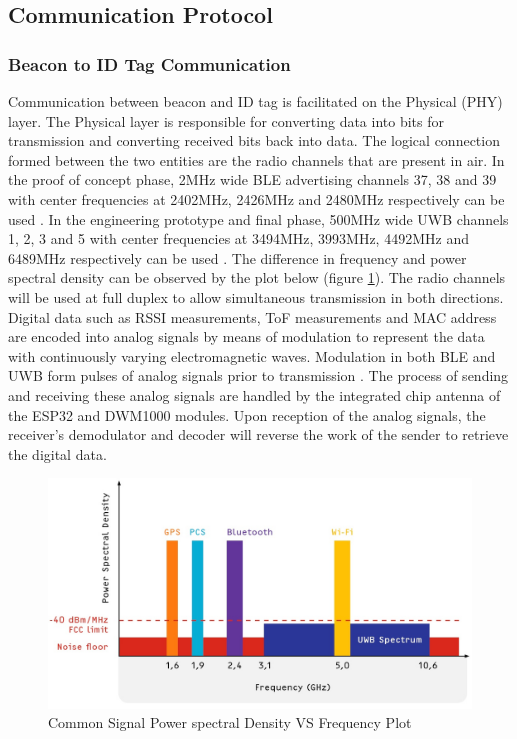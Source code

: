 \pagebreak
\subsection{Communication Protocol}
\subsubsection{Beacon to ID Tag Communication}
\medskip
Communication between beacon and ID tag is facilitated on the Physical (PHY) layer. The Physical layer is responsible for converting data into bits for transmission and converting received bits back into data. The logical connection formed between the two entities are the radio channels that are present in air. In the proof of concept phase, 2MHz wide BLE advertising channels 37, 38 and 39 with center frequencies at 2402MHz, 2426MHz and 2480MHz respectively can be used \cite{R4-2-3}. In the engineering prototype and final phase, 500MHz wide UWB channels 1, 2, 3 and 5 with center frequencies at 3494MHz, 3993MHz, 4492MHz and 6489MHz respectively can be used \cite{R4-2-2}. The difference in frequency and power spectral density can be observed by the plot below (figure \ref{spectrum}). The radio channels will be used at full duplex to allow simultaneous transmission in both directions. Digital data such as RSSI measurements, ToF measurements and MAC address are encoded into analog signals by means of modulation to represent the data with continuously varying electromagnetic waves. Modulation in both BLE and UWB form pulses of analog signals prior to transmission \cite{R4-2-3}. The process of sending and receiving these analog signals are handled by the integrated chip antenna of the ESP32 and DWM1000 modules. Upon reception of the analog signals, the receiver's demodulator and decoder will reverse the work of the sender to retrieve the digital data. 

\bigskip
\begin{figure}[H]
\centering
    \includegraphics[width=\linewidth]{./images/spectrum.jpg}
    \caption{Common Signal Power spectral Density VS Frequency Plot}
    \label{spectrum}
\end{figure}

